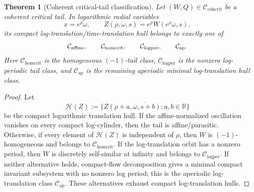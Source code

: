 \documentclass[11pt]{amsart}
\numberwithin{equation}{section}
\theoremstyle{plain}
\newtheorem{theorem}{Theorem}[section]
\theoremstyle{definition}
\theoremstyle{remark}
\newcommand{\R}{\mathbb R}
\newcommand{\Ccohcrit}{\mathcal C_{\mathrm{cohcrit}}}
\newcommand{\Chomcrit}{\mathcal C_{\mathrm{homcrit}}}
\newcommand{\Clogper}{\mathcal C_{\mathrm{logper}}}
\newcommand{\Capcrit}{\mathcal C_{\mathrm{ap}}}
\begin{document}
\begin{theorem}[Coherent critical-tail classification]
\label{thm:coherent-critical-tail-classification}
Let \((W,Q)\in\Ccohcrit\) be a coherent critical tail.  In logarithmic radial
variables
\[
   x=e^\rho\omega,\qquad Z(\rho,\omega,s)=e^\rho W(e^\rho\omega,s),
\]
its compact log-translation/time-translation hull belongs to exactly one of
\[
   \mathcal C_{\rm affine},\qquad
   \Chomcrit,\qquad
   \Clogper,\qquad
   \Capcrit .
\]
Here \(\Chomcrit\) is the homogeneous \((-1)\)-tail class,
\(\Clogper\) is the nonzero log-periodic tail class, and \(\Capcrit\) is the
remaining aperiodic minimal log-translation hull class.
\end{theorem}

\begin{proof}
Let
\[
   \mathcal H(Z):=
   \overline{\{Z(\rho+a,\omega,s+b):a,b\in\R\}}
\]
be the compact logarithmic translation hull.  If the affine-normalized
oscillation vanishes on every compact log-cylinder, then the tail is
affine/parasitic.  Otherwise, if every element of \(\mathcal H(Z)\) is independent of
\(\rho\), then \(W\) is \((-1)\)-homogeneous and belongs to \(\Chomcrit\).  If
the log-translation orbit has a nonzero period, then \(W\) is discretely
self-similar at infinity and belongs to \(\Clogper\).  If neither alternative
holds, compact-flow decomposition gives a minimal compact invariant subsystem
with no nonzero log period; this is the aperiodic log-translation class
\(\Capcrit\).  These alternatives exhaust compact log-translation hulls.
\end{proof}
\end{document}
